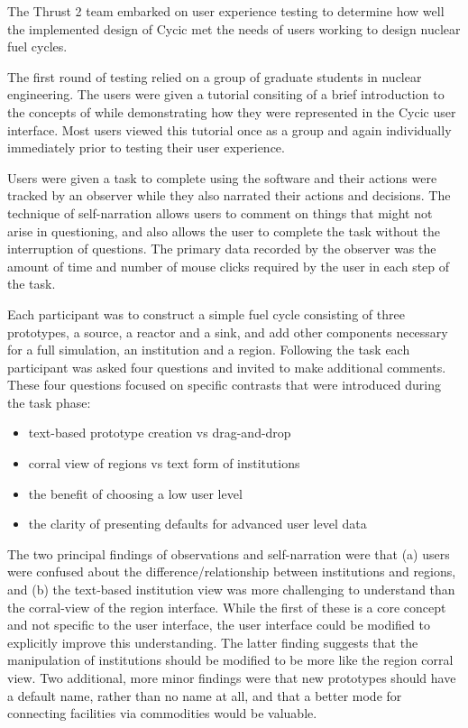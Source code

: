 The Thrust 2 team embarked on user experience testing to determine how well
the implemented design of Cycic met the needs of users working to design
nuclear fuel cycles.

The first round of testing relied on a group of graduate students in nuclear
engineering.  The users were given a tutorial consiting of a brief
introduction to the concepts of \Cyclus while demonstrating how they were
represented in the Cycic user interface.  Most users viewed this tutorial once
as a group and again individually immediately prior to testing their user
experience.

Users were given a task to complete using the software and their actions were
tracked by an observer while they also narrated their actions and decisions.
The technique of self-narration allows users to comment on things that might
not arise in questioning, and also allows the user to complete the task
without the interruption of questions.  The primary data recorded by the
observer was the amount of time and number of mouse clicks required by the
user in each step of the task.

Each participant was to construct a simple fuel cycle consisting of three
prototypes, a source, a reactor and a sink, and add other components necessary
for a full \Cyclus simulation, an institution and a region.  Following the
task each participant was asked four questions and invited to make additional
comments.  These four questions focused on specific contrasts that were
introduced during the task phase:
\begin{itemize}
\item text-based prototype creation vs drag-and-drop
\item corral view of regions vs text form of institutions
\item the benefit of choosing a low user level
\item the clarity of presenting defaults for advanced user level data
\end{itemize}

The two principal findings of observations and self-narration were that (a)
users were confused about the difference/relationship between institutions and
regions, and (b) the text-based institution view was more challenging to
understand than the corral-view of the region interface.  While the first of
these is a core \Cyclus concept and not specific to the user interface, the
user interface could be modified to explicitly improve this understanding.
The latter finding suggests that the manipulation of institutions should be
modified to be more like the region corral view. Two additional, more minor
findings were that new prototypes should have a default name, rather than no
name at all, and that a better mode for connecting facilities via commodities
would be valuable.


